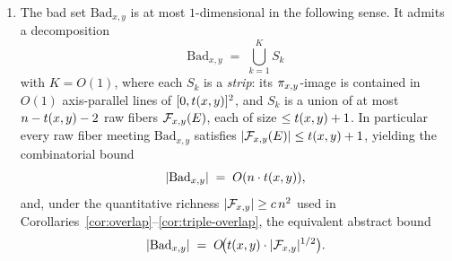 \begin{theorem}
\begin{enumerate}[label=(\roman*),nosep]
on $(i,j,\sigma)$ (cases (a),(b)) or transits between raw fibers $\Fxy(E)\to
\Fxy(E')$ with $(i,j,\sigma)$ fixed (case (c)).
\item\label{part:bad}
The bad set $\mathrm{Bad}_{x,y}$ is at most $1$-dimensional in the following
sense. It admits a decomposition
\[
\mathrm{Bad}_{x,y} \;=\; \bigcup_{k=1}^{K} S_k
\]
with $K=O(1)$, where each $S_k$ is a \emph{strip}: its $\pi_{x,y}$-image is
contained in $O(1)$ axis-parallel lines of $[0,t(x,y)]^2$, and $S_k$ is a
union of at most $n-t(x,y)-2$ raw fibers $\mathcal{F}_{x,y}(E)$, each of size $\le t(x,y)+1$.
In particular every raw fiber meeting $\mathrm{Bad}_{x,y}$ satisfies
$|\mathcal{F}_{x,y}(E)|\le t(x,y)+1$, yielding the combinatorial bound
\[
|\mathrm{Bad}_{x,y}|\;=\;O(n\cdot t(x,y)),
\]
and, under the quantitative richness $|\mathcal{F}_{x,y}|\ge c\,n^{2}$ used in
Corollaries~\ref{cor:overlap}--\ref{cor:triple-overlap}, the equivalent
abstract bound
\[
|\mathrm{Bad}_{x,y}|\;=\;O\!\bigl(t(x,y)\cdot|\mathcal{F}_{x,y}|^{1/2}\bigr).
\]
\end{enumerate}
\end{theorem}

